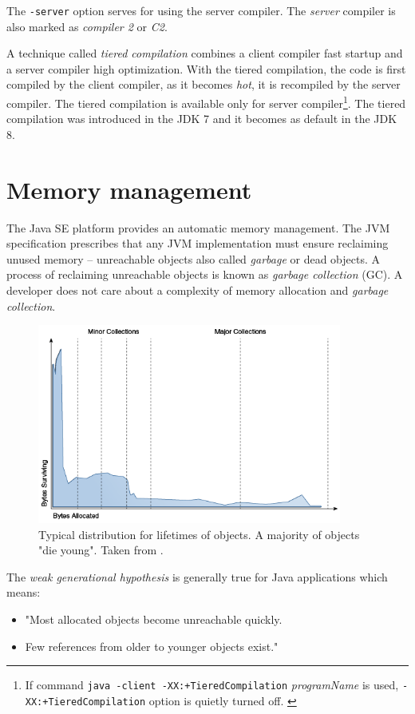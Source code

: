 \documentclass[
  digital, %
  oneside,
  notable, %
  nolof,     %
  nolot     %
]{fithesis3}
\begin{document}
The \texttt{-server} option serves for using the server compiler. The \textit{server} compiler is also marked as \textit{compiler 2} or \textit{C2}.

A technique called \textit{tiered compilation} combines a client compiler fast startup and a server compiler high optimization. With the tiered compilation, the code is first compiled by the client compiler, as it becomes \textit{hot}, it is recompiled by the server compiler. The tiered compilation is available only for server compiler\footnote{If command \texttt{java -client -XX:+TieredCompilation}\textit{ programName} is used, \texttt{-XX:+TieredCompilation} option is quietly turned off. \cite{scott}}. The tiered compilation was introduced in the JDK 7 and it becomes as default in the JDK 8. \cite{scott}
\section{Memory management}\label{memory}
The Java SE platform provides an automatic memory management. The JVM specification prescribes that any JVM implementation must ensure reclaiming unused memory -- unreachable objects also called \textit{garbage} or dead objects. A process of reclaiming unreachable objects is known as \textit{garbage collection} (GC). A developer does not care about a complexity of memory allocation and \textit{garbage collection}. \cite{gctuning}

\begin{figure}[h]
	\centering
	\includegraphics[width=10cm]{fig/survive.png}
	\caption{Typical distribution for lifetimes of objects. A majority of objects "die young". Taken from \cite{gctuning}.}
	\label{survive}
\end{figure}

The \textit{weak generational hypothesis} is generally true for Java applications which means: \cite{hunt}
\begin{itemize}
	\item "Most allocated objects become unreachable quickly.
	\item Few references from older to younger objects exist."
\end{itemize}
\end{document}
